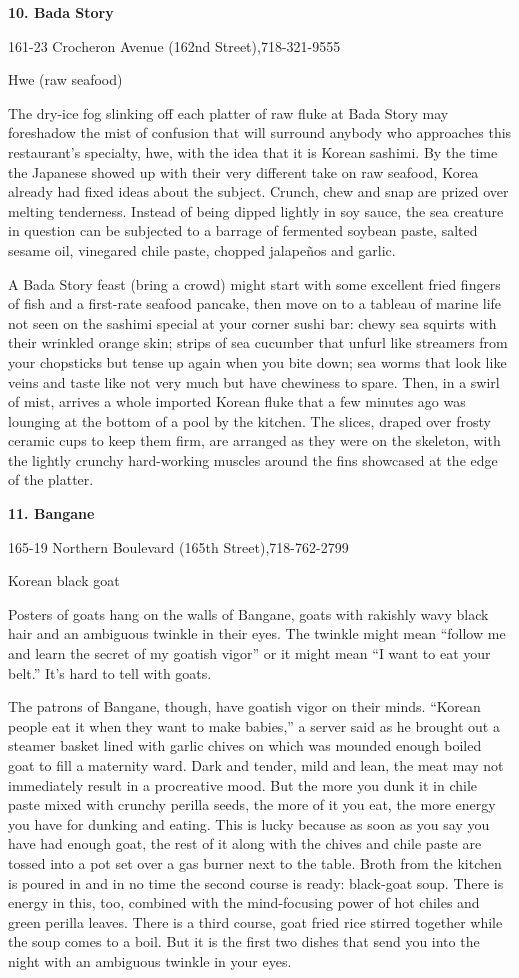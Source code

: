 \textbf{10. Bada Story}

161-23 Crocheron Avenue (162nd Street),718-321-9555

Hwe (raw seafood)

The dry-ice fog slinking off each platter of raw fluke at Bada Story may
foreshadow the mist of confusion that will surround anybody who
approaches this restaurant's specialty, hwe, with the idea that it is
Korean sashimi. By the time the Japanese showed up with their very
different take on raw seafood, Korea already had fixed ideas about the
subject. Crunch, chew and snap are prized over melting tenderness.
Instead of being dipped lightly in soy sauce, the sea creature in
question can be subjected to a barrage of fermented soybean paste,
salted sesame oil, vinegared chile paste, chopped jalapeños and garlic.

A Bada Story feast (bring a crowd) might start with some excellent fried
fingers of fish and a first-rate seafood pancake, then move on to a
tableau of marine life not seen on the sashimi special at your corner
sushi bar: chewy sea squirts with their wrinkled orange skin; strips of
sea cucumber that unfurl like streamers from your chopsticks but tense
up again when you bite down; sea worms that look like veins and taste
like not very much but have chewiness to spare. Then, in a swirl of
mist, arrives a whole imported Korean fluke that a few minutes ago was
lounging at the bottom of a pool by the kitchen. The slices, draped over
frosty ceramic cups to keep them firm, are arranged as they were on the
skeleton, with the lightly crunchy hard-working muscles around the fins
showcased at the edge of the platter.

\textbf{11. Bangane}

165-19 Northern Boulevard (165th Street),718-762-2799

Korean black goat

Posters of goats hang on the walls of Bangane, goats with rakishly wavy
black hair and an ambiguous twinkle in their eyes. The twinkle might
mean ``follow me and learn the secret of my goatish vigor'' or it might
mean ``I want to eat your belt.'' It's hard to tell with goats.

The patrons of Bangane, though, have goatish vigor on their minds.
``Korean people eat it when they want to make babies,'' a server said as
he brought out a steamer basket lined with garlic chives on which was
mounded enough boiled goat to fill a maternity ward. Dark and tender,
mild and lean, the meat may not immediately result in a procreative
mood. But the more you dunk it in chile paste mixed with crunchy perilla
seeds, the more of it you eat, the more energy you have for dunking and
eating. This is lucky because as soon as you say you have had enough
goat, the rest of it along with the chives and chile paste are tossed
into a pot set over a gas burner next to the table. Broth from the
kitchen is poured in and in no time the second course is ready:
black-goat soup. There is energy in this, too, combined with the
mind-focusing power of hot chiles and green perilla leaves. There is a
third course, goat fried rice stirred together while the soup comes to a
boil. But it is the first two dishes that send you into the night with
an ambiguous twinkle in your eyes.

